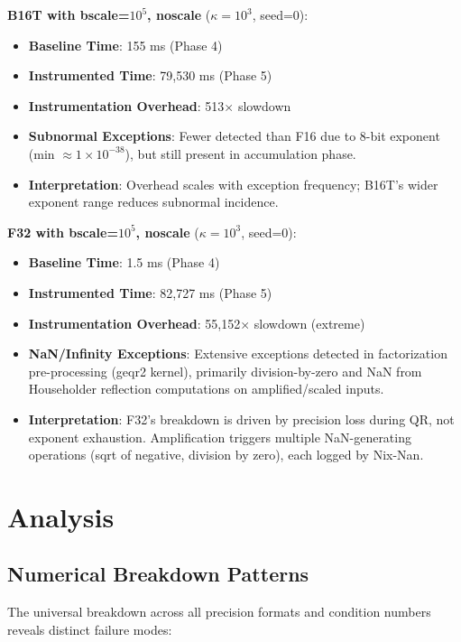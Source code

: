 \documentclass[11pt,a4paper]{article}
\begin{document}
\textbf{B16T with bscale=$10^5$, noscale} ($\kappa = 10^3$, seed=0):
\begin{itemize}
  \item \textbf{Baseline Time}: 155 ms (Phase 4)
  \item \textbf{Instrumented Time}: 79,530 ms (Phase 5)
  \item \textbf{Instrumentation Overhead}: 513$\times$ slowdown
  \item \textbf{Subnormal Exceptions}: Fewer detected than F16 due to 8-bit exponent (min $\approx 1 \times 10^{-38}$), but still present in accumulation phase.
  \item \textbf{Interpretation}: Overhead scales with exception frequency; B16T's wider exponent range reduces subnormal incidence.
\end{itemize}

\textbf{F32 with bscale=$10^5$, noscale} ($\kappa = 10^3$, seed=0):
\begin{itemize}
  \item \textbf{Baseline Time}: 1.5 ms (Phase 4)
  \item \textbf{Instrumented Time}: 82,727 ms (Phase 5)
  \item \textbf{Instrumentation Overhead}: 55,152$\times$ slowdown (extreme)
  \item \textbf{NaN/Infinity Exceptions}: Extensive exceptions detected in factorization pre-processing (geqr2 kernel), primarily division-by-zero and NaN from Householder reflection computations on amplified/scaled inputs.
  \item \textbf{Interpretation}: F32's breakdown is driven by precision loss during QR, not exponent exhaustion. Amplification triggers multiple NaN-generating operations (sqrt of negative, division by zero), each logged by Nix-Nan.
\end{itemize}

\section{Analysis}

\subsection{Numerical Breakdown Patterns}

The universal breakdown across all precision formats and condition numbers reveals distinct failure modes:
\end{document}

